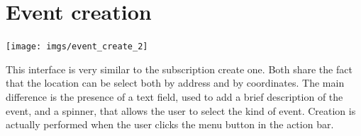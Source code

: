 \documentclass[a4paper]{scrreprt}
\begin{document}
\section{Event creation}
\begin{minipage}{0.5\textwidth}
	\centering
	\texttt{[image: imgs/event\_create\_2]}
\end{minipage}
\begin{minipage}{0.5\textwidth}
	This interface is very similar to the subscription create one. Both share the fact that the location can be select both by address and by coordinates. The main difference is the presence of a text field, used to add a brief description of the event, and a spinner, that allows the user to select the kind of event. Creation is actually performed when the user clicks the menu button in the action bar.
\end{minipage}
\end{document}
